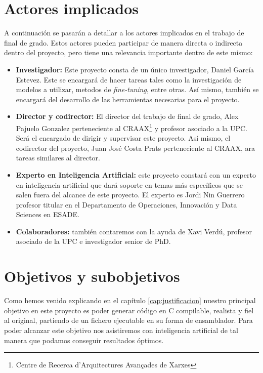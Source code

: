 \section{Actores implicados}
\label{sec:actores}


A continuación se pasarán a detallar a los actores implicados en el trabajo de final
de grado. Estos actores pueden participar de manera directa o indirecta dentro del
proyecto, pero tiene una relevancia importante dentro de este mismo:

\begin{itemize}
    \item \textbf{Investigador:} Este proyecto consta de un único investigador, Daniel
        García Estevez. Este se encargará de hacer tareas tales como la investigación
        de modelos a utilizar, metodos de \textit{fine-tuning}, entre otras. Así mismo,
        también se encargará del desarrollo de las herramientas necesarias para el proyecto.
    \item \textbf{Director y codirector:} El director del trabajo de final de grado, Alex
        Pajuelo Gonzalez perteneciente al CRAAX\footnote{Centre de Recerca d'Arquitectures
        Avançades de Xarxes} y profesor asociado a la UPC. Será el encargado de dirigir y
        supervisar este proyecto. Así mismo, el codirector del proyecto, Juan José Costa Prats
        perteneciente al CRAAX, ara tareas similares al director.
    \item \textbf{Experto en Inteligencia Artificial:} este proyecto constará con un experto en
        inteligencia artificial que dará soporte en temas más específicos que se salen fuera del
        alcance de este proyecto. El experto es Jordi Nin Guerrero profesor titular en el
        Departamento de Operaciones, Innovación y Data Sciences en ESADE.
    \item \textbf{Colaboradores:} también contaremos con la ayuda de Xavi Verdú, profesor asociado
        de la UPC e investigador senior de PhD.
\end{itemize}

\section{Objetivos y subobjetivos}
\label{sec:objetivos}


Como hemos venido explicando en el capítulo \ref{cap:justificacion} nuestro principal
objetivo en este proyecto es poder generar código en C compilable, realista y fiel
al original, partiendo de un fichero ejecutable en su forma de ensamblador. Para
poder alcanzar este objetivo nos asistiremos con inteligencia artificial de tal
manera que podamos conseguir resultados óptimos.

